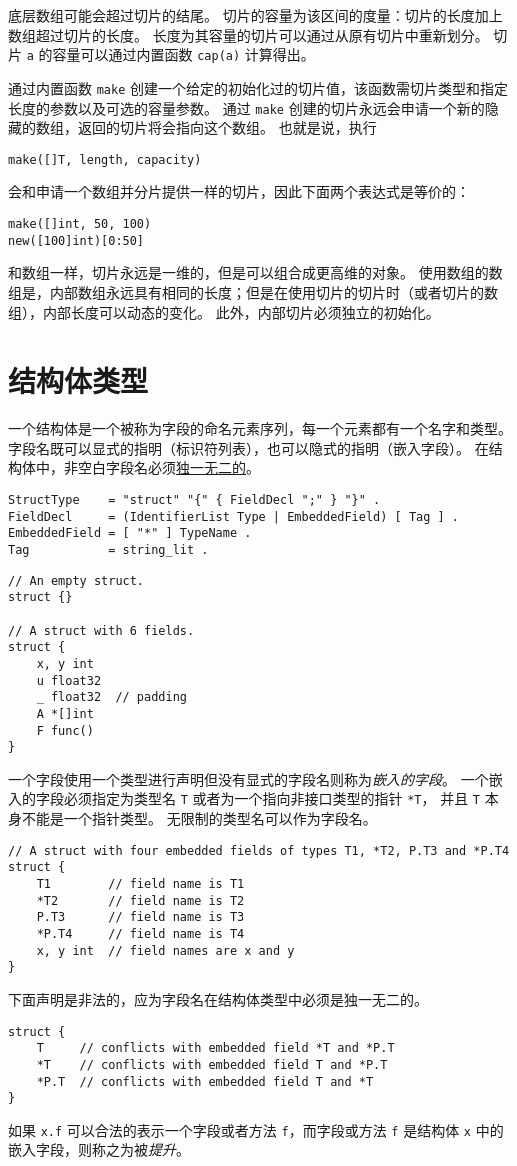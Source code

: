 底层数组可能会超过切片的结尾。
切片的容量为该区间的度量：切片的长度加上数组超过切片的长度。
长度为其容量的切片可以通过从原有切片中重新划分。%
切片 \lstinline|a| 的容量可以通过内置函数 \lstinline|cap(a)| 计算得出。

通过内置函数 \lstinline|make| 创建一个给定的初始化过的切片值，该函数需切片类型和指定长度的参数以及可选的容量参数。
通过 \lstinline|make| 创建的切片永远会申请一个新的隐藏的数组，返回的切片将会指向这个数组。
也就是说，执行
\begin{lstlisting}[style=golang]
make([]T, length, capacity)
\end{lstlisting}
会和申请一个数组并分片提供一样的切片，因此下面两个表达式是等价的：
\begin{lstlisting}
make([]int, 50, 100)
new([100]int)[0:50]
\end{lstlisting}
和数组一样，切片永远是一维的，但是可以组合成更高维的对象。
使用数组的数组是，内部数组永远具有相同的长度；但是在使用切片的切片时（或者切片的数组），内部长度可以动态的变化。
此外，内部切片必须独立的初始化。

\section{结构体类型}\label{sec:struct types}
一个结构体是一个被称为字段的命名元素序列，每一个元素都有一个名字和类型。
字段名既可以显式的指明（标识符列表），也可以隐式的指明（嵌入字段）。
在结构体中，非空白字段名必须\hyperref[sec:uniqueness of identifiers]{独一无二的}。
\begin{lstlisting}[style=EBNF]
StructType    = "struct" "{" { FieldDecl ";" } "}" .
FieldDecl     = (IdentifierList Type | EmbeddedField) [ Tag ] .
EmbeddedField = [ "*" ] TypeName .
Tag           = string_lit .
\end{lstlisting}

\begin{lstlisting}[style=golang]
// An empty struct.
struct {}

// A struct with 6 fields.
struct {
	x, y int
	u float32
	_ float32  // padding
	A *[]int
	F func()
}
\end{lstlisting}
一个字段使用一个类型进行声明但没有显式的字段名则称为\emph{嵌入的字段}。
一个嵌入的字段必须指定为类型名 \lstinline|T| 或者为一个指向非接口类型的指针 \lstinline|*T|，
并且 \lstinline|T| 本身不能是一个指针类型。
无限制的类型名可以作为字段名。
\begin{lstlisting}[style=golang]
// A struct with four embedded fields of types T1, *T2, P.T3 and *P.T4
struct {
	T1        // field name is T1
	*T2       // field name is T2
	P.T3      // field name is T3
	*P.T4     // field name is T4
	x, y int  // field names are x and y
}
\end{lstlisting}
下面声明是非法的，应为字段名在结构体类型中必须是独一无二的。
\begin{lstlisting}[style=golang]
struct {
	T     // conflicts with embedded field *T and *P.T
	*T    // conflicts with embedded field T and *P.T
	*P.T  // conflicts with embedded field T and *T
}
\end{lstlisting}
如果 \lstinline|x.f| 可以合法的表示一个字段或者方法 \lstinline|f|，而字段或方法 \lstinline|f| 是结构体 \lstinline|x| 中的嵌入字段，则称之为被\emph{提升}。

